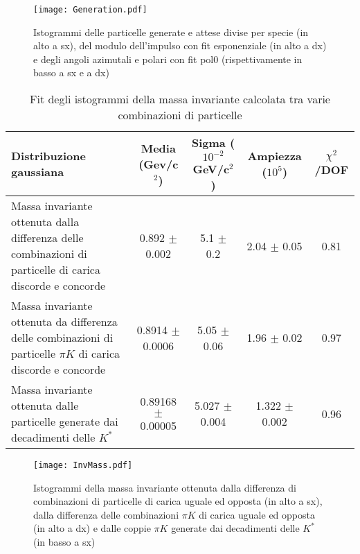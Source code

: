 \documentclass[a4paper,10pt]{article}
\begin{document}
\begin{figure*}[p]
  \centering
  \texttt{[image: Generation.pdf]}
  \caption{Istogrammi delle particelle generate e attese divise per specie (in alto a sx), del modulo dell'impulso con fit esponenziale (in alto a dx) e degli angoli azimutali e polari con fit pol0 (rispettivamente in basso a sx e a dx)}
  \label{fig:Generation}
\end{figure*}

\begin{table*}
  \caption{Fit degli istogrammi della massa invariante calcolata tra varie combinazioni di particelle}
  \label{tab:fitgaus}
  \centering
  \begin{tabular}{p{5cm}cccc}
    \toprule
    Distribuzione gaussiana                                                                                        & Media (Gev/c$^2$)     & Sigma ($10^{-2}$ GeV/c$^2$) & Ampiezza ($10^5$) & $\chi^2$/DOF \\
    \midrule
    Massa invariante ottenuta dalla differenza delle combinazioni di particelle di carica discorde e concorde      & 0.892 $\pm$ 0.002     & 5.1 $\pm$ 0.2               & 2.04 $\pm$ 0.05   & 0.81         \\
    \midrule
    Massa invariante ottenuta da differenza delle combinazioni di particelle $\pi K$ di carica discorde e concorde & 0.8914 $\pm$ 0.0006   & 5.05 $\pm$ 0.06             & 1.96 $\pm$ 0.02   & 0.97         \\
    \midrule
    Massa invariante ottenuta dalle particelle generate dai decadimenti delle $K^*$                                & 0.89168 $\pm$ 0.00005 & 5.027 $\pm$ 0.004           & 1.322 $\pm$ 0.002 & 0.96         \\
    \bottomrule
  \end{tabular}
\end{table*}

\begin{figure*}[t]
  \centering
  \texttt{[image: InvMass.pdf]}
  \caption{Istogrammi della massa invariante ottenuta dalla differenza di combinazioni di particelle di carica uguale ed opposta (in alto a sx), dalla differenza delle combinazioni $\pi K$ di carica uguale ed opposta (in alto a dx) e dalle coppie $\pi K$ generate dai decadimenti delle $K^*$ (in basso a sx)}
  \label{fig:InvMass}
\end{figure*}

\newpage
\lstlistoflistings









\end{document}
